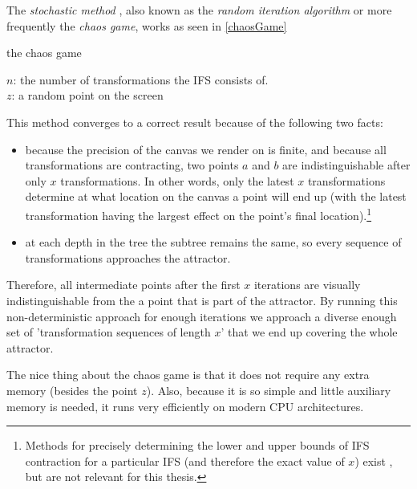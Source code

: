 \documentclass[11pt]{article}
\begin{document}
The \emph{stochastic method} \cite{hepting1991rendering}, also known as the \emph{random iteration algorithm} \cite{barnsley2014fractals} or more frequently the \emph{chaos game}, works as seen in \autoref{chaosGame}

\begin{algorithm}[H]
\caption{the chaos game}
\label{chaosGame}
  $n$: the number of transformations the IFS consists of. \\
  $z$: a random point on the screen  \\

\end{algorithm}

This method converges to a correct result because of the following two facts:

\begin{itemize}
\item because the precision of the canvas we render on is finite, and because all transformations are contracting,
two points \(a\) and \(b\) are indistinguishable after only \(x\) transformations.
 In other words, only the latest \(x\) transformations determine at what location on the canvas a point will end up (with the latest transformation having the largest effect on the point's final location).\footnote{Methods for precisely determining the lower and upper bounds of IFS contraction for a particular IFS (and therefore the exact value of \(x\)) exist \cite{hepting1991rendering}, 
but are not relevant for this thesis.}
\item at each depth in the tree the subtree remains the same, so every sequence of transformations approaches the attractor.
\end{itemize}

Therefore, all intermediate points after the first \(x\) iterations are visually indistinguishable from the a point that is part of the attractor.
By running this non-deterministic approach for enough iterations we approach a diverse enough set of 'transformation sequences of length \(x\)' that we end up covering the whole attractor.

The nice thing about the chaos game is that it does not require any extra memory (besides the point \(z\)).
Also, because it is so simple and little auxiliary memory is needed, it runs very efficiently on modern CPU architectures.
\end{document}
